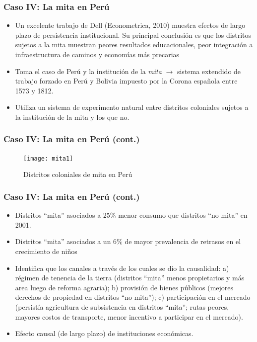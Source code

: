 \documentclass[handout,final,xcolor=dvipsnames]{beamer}
\begin{document}
\begin{frame}\frametitle{Caso IV: La mita en Perú}
  \begin{itemize}\itemsep 10pt
  \item Un excelente trabajo de Dell (Econometrica, 2010) muestra
    efectos de largo plazo de persistencia institucional. Su principal
    conclusión es que los distritos sujetos a la mita muestran peores
    resultados educacionales, peor integración a infraestructura de
    caminos y economías más precarias
    \item Toma el caso de Perú y la institución de la \textit{mita}
      $\longrightarrow$ sistema extendido de trabajo forzado en Perú y
      Bolivia impuesto por la Corona española entre 1573 y 1812.
      \item Utiliza un sistema de experimento natural entre distritos coloniales
        sujetos a la institución de la mita y los que no. 
    \end{itemize}
\end{frame}




\begin{frame}\frametitle{Caso IV: La mita en Perú (cont.)}
   \begin{figure}[htbp]
    \centering \vspace{0cm}
    \texttt{[image: mita1]}
    \caption{Distritos coloniales de mita en Perú}
    \label{fig:ar1}
  \end{figure}
\end{frame}



\begin{frame}\frametitle{Caso IV: La mita en Perú (cont.)}
  \begin{itemize}\itemsep 10pt
  \item Distritos ``mita'' asociados a 25\% menor consumo que
    distritos ``no mita'' en 2001.
    \item Distritos ``mita'' asociados a un 6\% de mayor prevalencia
      de retrasos en el crecimiento de niños
      \item Identifica que los canales a través de los cuales se
        dio la causalidad: a) régimen de tenencia de la tierra
        (distritos ``mita'' menos propietarios y más area luego de
        reforma agraria); b)
        provisión de bienes públicos (mejores derechos de propiedad en
        distritos ``no mita''); c) participación en el mercado
        (persistía agricultura de subsistencia en distritos ``mita'';
        rutas peores, mayores costos de transporte, menor incentivo a
        participar en el mercado). 
        \item Efecto causal (de largo plazo) de instituciones
          económicas. 
    \end{itemize}
\end{frame}
\end{document}
